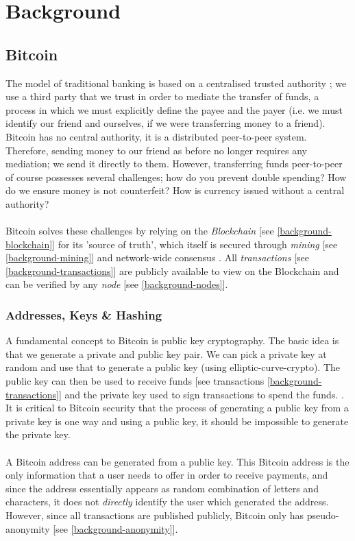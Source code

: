 \chapter{Background}

\section{Bitcoin}
The model of traditional banking is based on a centralised trusted authority \cite{RefWorks:doc:5c39e80ae4b0854ae611b047}; we use a third party that we trust in order to mediate the transfer of funds, a process in which we must explicitly define the payee and the payer (i.e. we must identify our friend and ourselves, if we were transferring money to a friend). Bitcoin has no central authority, it is a distributed peer-to-peer system. Therefore, sending money to our friend as before no longer requires any mediation; we send it directly to them. However, transferring funds peer-to-peer of course possesses several challenges; how do you prevent double spending? How do we ensure money is not counterfeit? \cite{RefWorks:doc:5c39e80ae4b0854ae611b047} How is currency issued without a central authority? 
\\\\
Bitcoin solves these challenges by relying on the \textit{Blockchain} [see \ref{background-blockchain}] for its 'source of truth', which itself is secured through \textit{mining} [see \ref{background-mining}] and network-wide consensus \cite{RefWorks:doc:5c39e80ae4b0854ae611b047}. All \textit{transactions} [see \ref{background-transactions}] are publicly available to view on the Blockchain and can be verified by any \textit{node} [see \ref{background-nodes}]. 

\subsection{Addresses, Keys \& Hashing}
A fundamental concept to Bitcoin is public key cryptography. The basic idea is that we generate a private and public key pair. We can pick a private key at random and use that to generate a public key (using \gls{elliptic-curve-crypto}). The public key can then be used to receive funds [see transactions \ref{background-transactions}] and the private key used to sign transactions to spend the funds. \cite{RefWorks:doc:5c39e80ae4b0854ae611b047}. It is critical to Bitcoin security that the process of generating a public key from a private key is one way and using a public key, it should be impossible to generate the private key. 
\\\\
A Bitcoin address can be generated from a public key. This Bitcoin address is the only information that a user needs to offer in order to receive payments, and since the address essentially appears as random combination of letters and characters, it does not \textit{directly} identify the user which generated the address. However, since all transactions are published publicly, Bitcoin only has pseudo-anonymity [see \ref{background-anonymity}].


